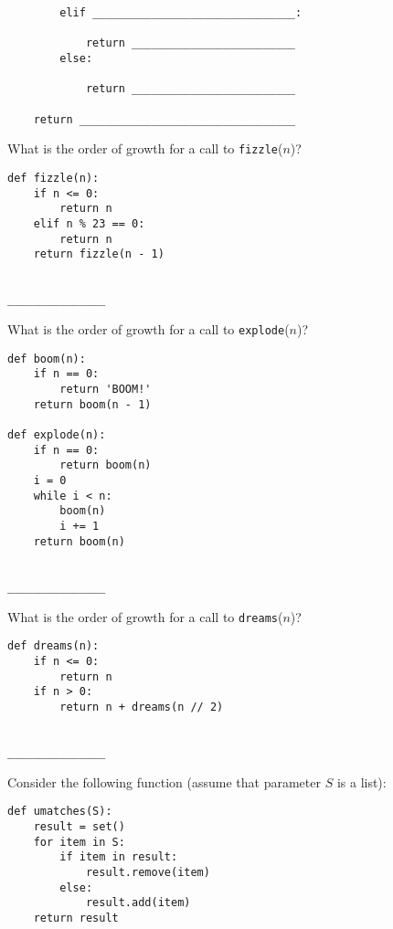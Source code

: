 \documentclass[twoside]{article}
\begin{document}
\begin{enumerate}
\begin{lstlisting}
        elif _______________________________:
        
            return _________________________
        else:
        
            return _________________________
            
    return _________________________________
\end{lstlisting}


\begin{enumerate}
What is the order of growth for a call to \texttt{fizzle}($n$)?

\begin{lstlisting}
def fizzle(n):
    if n <= 0:
        return n
    elif n % 23 == 0:
        return n
    return fizzle(n - 1)
\end{lstlisting}
~\\
\lstinline{_______________}

\newpage

What is the order of growth for a call to \texttt{explode}($n$)?

\begin{lstlisting}
def boom(n):
    if n == 0:
        return 'BOOM!'
    return boom(n - 1)

def explode(n):
    if n == 0:
        return boom(n)
    i = 0
    while i < n:
        boom(n)
        i += 1
    return boom(n)
\end{lstlisting}
~\\
\lstinline{_______________}

What is the order of growth for a call to \texttt{dreams}($n$)?

\begin{lstlisting}
def dreams(n):
    if n <= 0:
        return n
    if n > 0:
        return n + dreams(n // 2)
\end{lstlisting}
~\\
\lstinline{_______________}
\end{enumerate}


Consider the following function (assume that parameter $S$ is a list):

\begin{lstlisting}
def umatches(S):
    result = set()
    for item in S:
        if item in result:
            result.remove(item)
        else:
            result.add(item)
    return result
\end{lstlisting}


\end{enumerate}
\end{document}
